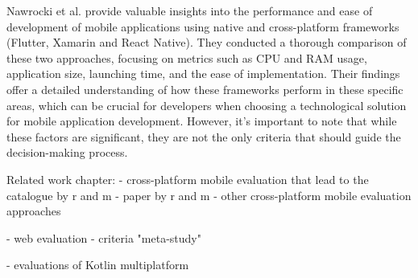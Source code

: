 Nawrocki et al. provide valuable insights into the performance and ease of development of mobile applications using native and cross-platform frameworks (Flutter, Xamarin and React Native). They conducted a thorough comparison of these two approaches, focusing on metrics such as CPU and RAM usage, application size, launching time, and the ease of implementation. Their findings offer a detailed understanding of how these frameworks perform in these specific areas, which can be crucial for developers when choosing a technological solution for mobile application development. However, it's important to note that while these factors are significant, they are not the only criteria that should guide the decision-making process.





Related work chapter: 
- cross-platform mobile evaluation that lead to the catalogue by r and m
- paper by r and m 
- other cross-platform mobile evaluation approaches

- web evaluation
- criteria "meta-study"

- evaluations of Kotlin multiplatform

